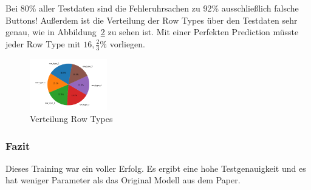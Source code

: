 \documentclass[pdftex,a4paper,halfparskip, article]{scrartcl}
\begin{document}
\begin{figure}
\begin{minipage}{.33\textwidth}
  \label{fig:fehler_schlechteste20_bin10}
\end{minipage}%
\end{figure}

Bei 80\% aller Testdaten sind die Fehleruhrsachen zu 92\% ausschließlich falsche Buttons! Außerdem ist die Verteilung der Row Types über den Testdaten sehr genau, wie in Abbildung~\ref{fig:bin10_row_type} zu sehen ist. Mit einer Perfekten Prediction müsste jeder Row Type mit $16,\frac{2}{3}\%$ vorliegen.

\begin{figure}[h]
\centering
\includegraphics[width=0.3\textwidth]{predictions_bin10_predicted_row_type_distribution}
\caption{Verteilung Row Types}
\label{fig:bin10_row_type}
\end{figure}


\subsubsection*{Fazit}

Dieses Training war ein voller Erfolg. Es ergibt eine hohe Testgenauigkeit und es hat weniger Parameter als das Original Modell aus dem Paper. 

\end{document}
